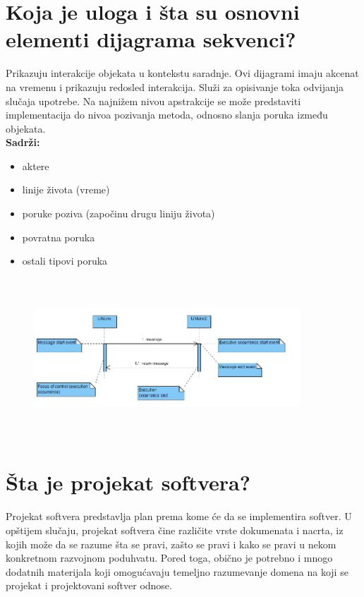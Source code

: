 \documentclass[a4paper]{article}
\begin{document}
\section{Koja je uloga i šta su osnovni elementi dijagrama sekvenci?}
  Prikazuju interakcije objekata u kontekstu saradnje. Ovi dijagrami imaju akcenat na vremenu i
  prikazuju redosled interakcija. Služi za opisivanje toka odvijanja slučaja upotrebe. 
  Na najnižem nivou apstrakcije se može predstaviti implementacija do nivoa pozivanja
  metoda, odnosno slanja poruka između objekata. \\
  \textbf{Sadrži:}
  \begin{itemize}
    \item aktere
    \item linije života (vreme)
    \item poruke poziva (započinu drugu liniju života)
    \item povratna poruka
    \item ostali tipovi poruka
  \end{itemize}
  \begin{figure}[H]
    \begin{center}
        \includegraphics[width=100mm,height=60mm]{Slike/uml_sekvenci.png}
    \end{center}
  \end{figure} 

\section{Šta je projekat softvera?}
  Projekat softvera predstavlja plan prema kome će da se implementira softver. U opštijem slučaju, projekat softvera čine različite vrste dokumenata i nacrta, iz kojih može da se razume šta se pravi, zašto se pravi i kako se pravi u nekom konkretnom razvojnom poduhvatu. Pored toga, obično je potrebno i mnogo dodatnih materijala koji omogućavaju temeljno razumevanje domena na koji se projekat i projektovani softver odnose.
\end{document}
